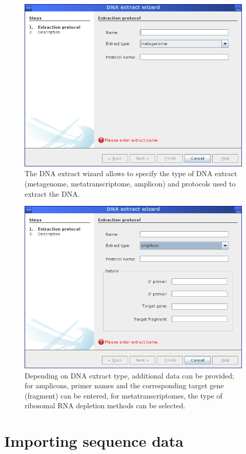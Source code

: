 \begin{figure}[H]
\centering
\includegraphics[width=.8\textwidth]{img/mgx/extractwiz1}
\caption[DNA extract wizard]{The DNA extract wizard allows to specify the type of DNA extract (metagenome, 
metatranscriptome, amplicon) and protocols used to extract the DNA.}
\label{extractwiz1}
\end{figure}

\begin{figure}[H]
\centering
\includegraphics[width=.8\textwidth]{img/mgx/extractwiz2}
\caption[DNA extract wizard]{Depending on DNA extract type, additional data can be provided; for amplicons, primer
names and the corresponding target gene (fragment) can be entered, for metatranscriptomes, the type of ribosomal 
RNA depletion methods can be selected.}
\label{extractwiz2}
\end{figure}

\section{Importing sequence data}


